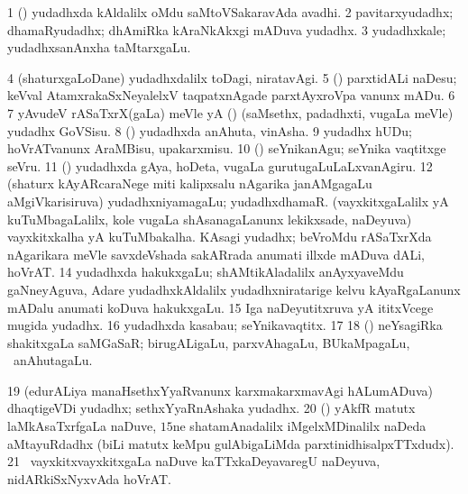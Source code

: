 {\noindent 
\gl{\pagu}
\expl{}
\bmng
\bnum
\num{1}  (\AmA) yudadhxda kAldalilx oMdu saMtoVSakaravAda avadhi. 
\num{2}  pavitarxyudadhx; dhamaRyudadhx; dhAmiRka kAraNkAkxgi mADuva yudadhx. 
\num{3}  yudadhxkale; yudadhxsanAnxha taMtarxgaLu. 
\num{4}  (shaturxgaLoDane) yudadhxdalilx toDagi, niratavAgi. 
\num{5}  (\rUpa) parxtidALi naDesu; keVval AtamxrakaSxNeyalelxV taqpatxnAgade parxtAyxroVpa \mo vanunx mADu. 
\num{6}  
\num{7}  yAvudeV rASaTxrX(gaLa) meVle yA (\rUpa) (saMsethx, padadhxti, \mo vugaLa meVle) yudadhx GoVSisu. 
\num{8}  (\kAparx) yudadhxda anAhuta, vinAsha. 
\num{9}  yudadhx hUDu; hoVrATvanunx AraMBisu, upakarxmisu. 
\num{10}  (\pArxparx) seYnikanAgu; seYnika vaqtitxge seVru. 
\num{11}  (\AmA) yudadhxda gAya, hoDeta, \mo vugaLa gurutugaLuLaLxvanAgiru. 
\num{12}  (shaturx kAyARcaraNege miti kalipxsalu nAgarika janAMgagaLu aMgiVkarisiruva) yudadhxniyamagaLu; yudadhxdhamaR. 
  
\banum
{} (vayxkitxgaLalilx yA kuTuMbagaLalilx, kole \mo vugaLa shAsanagaLanunx lekikxsade, naDeyuva) vayxkitxkalha yA kuTuMbakalha. 
 KAsagi yudadhx; beVroMdu rASaTxrXda nAgarikara meVle savxdeVshada sakARrada anumati illxde mADuva dALi, hoVrAT. 
\eanum
\numie
\num{14}  yudadhxda hakukxgaLu; shAMtikAladalilx anAyxyaveMdu gaNneyAguva, Adare yudadhxkAldalilx yudadhxniratarige kelvu kAyaRgaLanunx mADalu anumati koDuva hakukxgaLu. 
\num{15}  Iga naDeyutitxruva yA ititxVcege mugida yudadhx. 
\num{16}  yudadhxda kasabau; seYnikavaqtitx. 
\num{17}  
\num{18}  (\kAparx) neYsagiRka shakitxgaLa saMGaSaR; birugALigaLu, parxvAhagaLu, BUkaMpagaLu, \mo\ anAhutagaLu. 
\num{19}  (edurALiya manaHsethxYyaRvanunx karxmakarxmavAgi hALumADuva) dhaqtigeVDi yudadhx; sethxYyaRnAshaka yudadhx. 
\num{20}  (\ca) yAkfR matutx laMkAsaTxrfgaLa naDuve, $15$ne shatamAnadalilx iMgelxMDinalilx naDeda aMtayuRdadhx (biLi matutx keMpu gulAbigaLiMda parxtinidhisalpxTTxdudx). 
\num{21}  \kanmu\ vayxkitxvayxkitxgaLa naDuve kaTTxkaDeyavaregU naDeyuva, nidARkiSxNyxvAda hoVrAT. 
\enum
\emng
\eentry

}
